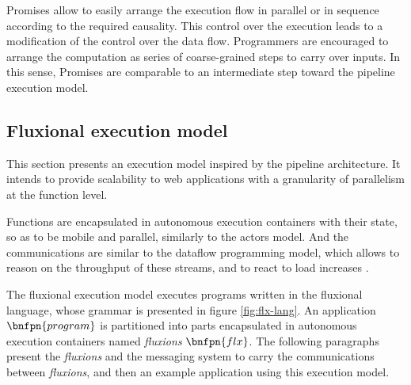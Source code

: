 Promises allow to easily arrange the execution flow in parallel or in sequence according to the required causality.
This control over the execution leads to a modification of the control over the data flow.
Programmers are encouraged to arrange the computation as series of coarse-grained steps to carry over inputs.
In this sense, Promises are comparable to an intermediate step toward the pipeline execution model.



\subsection{Fluxional execution model} \label{chapter4:flx-model}

This section presents an execution model inspired by the pipeline architecture.
It intends to provide scalability to web applications with a granularity of parallelism at the function level.

Functions are encapsulated in autonomous execution containers with their state, so as to be mobile and parallel, similarly to the actors model.
And the communications are similar to the dataflow programming model, which allows to reason on the throughput of these streams, and to react to load increases \cite{Bartenstein2014}.

The fluxional execution model executes programs written in the fluxional language, whose grammar is presented in figure \ref{fig:flx-lang}.
An application $\bnfpn{program}$ is partitioned into parts encapsulated in autonomous execution containers named \textit{fluxions} $\bnfpn{flx}$.
The following paragraphs present the \textit{fluxions} and the messaging system to carry the communications between \textit{fluxions}, and then an example application using this execution model.

